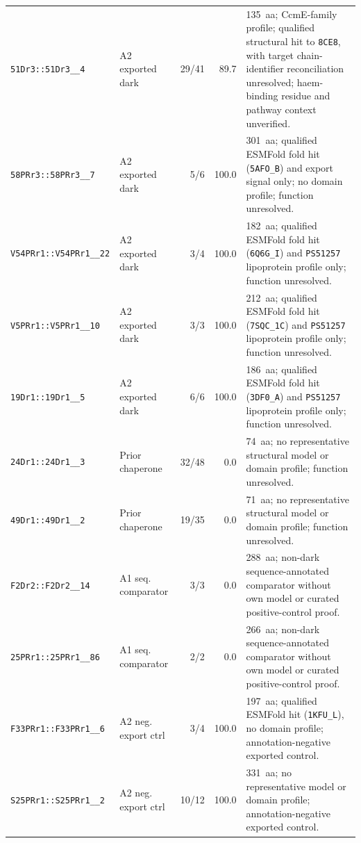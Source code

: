 {\begin{longtable}{@{}p{}p{}rrp{}@{}}
\texttt{51Dr3::\allowbreak 51Dr3\_\allowbreak 552805\_4} & A2 exported dark & 29/41 & 89.7 & 135~aa; CcmE-family profile; qualified structural hit to \texttt{8CE8}, with target chain-identifier reconciliation unresolved; haem-binding residue and pathway context unverified.\\
\texttt{58PRr3::\allowbreak 58PRr3\_\allowbreak 78238\_7} & A2 exported dark & 5/6 & 100.0 & 301~aa; qualified ESMFold fold hit (\texttt{5AFO\_B}) and export signal only; no domain profile; function unresolved.\\
\texttt{V54PRr1::\allowbreak V54PRr1\_\allowbreak 1398418\_22} & A2 exported dark & 3/4 & 100.0 & 182~aa; qualified ESMFold fold hit (\texttt{6Q6G\_I}) and \texttt{PS51257} lipoprotein profile only; function unresolved.\\
\texttt{V5PRr1::\allowbreak V5PRr1\_\allowbreak 1531162\_10} & A2 exported dark & 3/3 & 100.0 & 212~aa; qualified ESMFold fold hit (\texttt{7SQC\_1C}) and \texttt{PS51257} lipoprotein profile only; function unresolved.\\
\texttt{19Dr1::\allowbreak 19Dr1\_\allowbreak 436937\_5} & A2 exported dark & 6/6 & 100.0 & 186~aa; qualified ESMFold fold hit (\texttt{3DF0\_A}) and \texttt{PS51257} lipoprotein profile only; function unresolved.\\
\midrule
\texttt{24Dr1::\allowbreak 24Dr1\_\allowbreak 1575644\_3} & Prior chaperone & 32/48 & 0.0 & 74~aa; no representative structural model or domain profile; function unresolved.\\
\texttt{49Dr1::\allowbreak 49Dr1\_\allowbreak 177214\_2} & Prior chaperone & 19/35 & 0.0 & 71~aa; no representative structural model or domain profile; function unresolved.\\
\texttt{F2Dr2::\allowbreak F2Dr2\_\allowbreak 1765803\_14} & A1 seq. comparator & 3/3 & 0.0 & 288~aa; non-dark sequence-annotated comparator without own model or curated positive-control proof.\\
\texttt{25PRr1::\allowbreak 25PRr1\_\allowbreak 18267\_86} & A1 seq. comparator & 2/2 & 0.0 & 266~aa; non-dark sequence-annotated comparator without own model or curated positive-control proof.\\
\texttt{F33PRr1::\allowbreak F33PRr1\_\allowbreak 1692216\_6} & A2 neg. export ctrl & 3/4 & 100.0 & 197~aa; qualified ESMFold hit (\texttt{1KFU\_L}), no domain profile; annotation-negative exported control.\\
\texttt{S25PRr1::\allowbreak S25PRr1\_\allowbreak 754633\_2} & A2 neg. export ctrl & 10/12 & 100.0 & 331~aa; no representative model or domain profile; annotation-negative exported control.\\

\end{longtable}}
